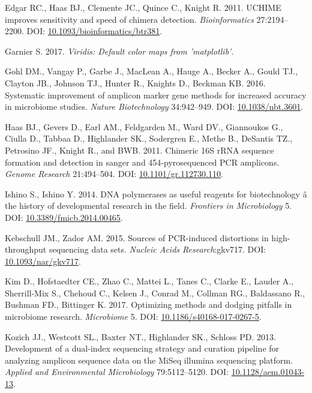 \documentclass[11pt,]{article}
\begin{document}
\hypertarget{ref-uchime_Edgar_2011}{}
Edgar RC., Haas BJ., Clemente JC., Quince C., Knight R. 2011. UCHIME
improves sensitivity and speed of chimera detection.
\emph{Bioinformatics} 27:2194--2200. DOI:
\href{https://doi.org/10.1093/bioinformatics/btr381}{10.1093/bioinformatics/btr381}.

\hypertarget{ref-viridis_citation_2017}{}
Garnier S. 2017. \emph{Viridis: Default color maps from 'matplotlib'}.

\hypertarget{ref-taq_Gohl_2016}{}
Gohl DM., Vangay P., Garbe J., MacLean A., Hauge A., Becker A., Gould
TJ., Clayton JB., Johnson TJ., Hunter R., Knights D., Beckman KB. 2016.
Systematic improvement of amplicon marker gene methods for increased
accuracy in microbiome studies. \emph{Nature Biotechnology} 34:942--949.
DOI: \href{https://doi.org/10.1038/nbt.3601}{10.1038/nbt.3601}.

\hypertarget{ref-Haas2011}{}
Haas BJ., Gevers D., Earl AM., Feldgarden M., Ward DV., Giannoukos G.,
Ciulla D., Tabbaa D., Highlander SK., Sodergren E., Methe B., DeSantis
TZ., Petrosino JF., Knight R., and BWB. 2011. Chimeric 16S rRNA sequence
formation and detection in sanger and 454-pyrosequenced PCR amplicons.
\emph{Genome Research} 21:494--504. DOI:
\href{https://doi.org/10.1101/gr.112730.110}{10.1101/gr.112730.110}.

\hypertarget{ref-polymerase_Ishino_2014}{}
Ishino S., Ishino Y. 2014. DNA polymerases as useful reagents for
biotechnology â the history of developmental research in the field.
\emph{Frontiers in Microbiology} 5. DOI:
\href{https://doi.org/10.3389/fmicb.2014.00465}{10.3389/fmicb.2014.00465}.

\hypertarget{ref-Kebschull2015}{}
Kebschull JM., Zador AM. 2015. Sources of PCR-induced distortions in
high-throughput sequencing data sets. \emph{Nucleic Acids
Research}:gkv717. DOI:
\href{https://doi.org/10.1093/nar/gkv717}{10.1093/nar/gkv717}.

\hypertarget{ref-review_Kim_2017}{}
Kim D., Hofstaedter CE., Zhao C., Mattei L., Tanes C., Clarke E., Lauder
A., Sherrill-Mix S., Chehoud C., Kelsen J., Conrad M., Collman RG.,
Baldassano R., Bushman FD., Bittinger K. 2017. Optimizing methods and
dodging pitfalls in microbiome research. \emph{Microbiome} 5. DOI:
\href{https://doi.org/10.1186/s40168-017-0267-5}{10.1186/s40168-017-0267-5}.

\hypertarget{ref-protocol_Kozich_2013}{}
Kozich JJ., Westcott SL., Baxter NT., Highlander SK., Schloss PD. 2013.
Development of a dual-index sequencing strategy and curation pipeline
for analyzing amplicon sequence data on the MiSeq illumina sequencing
platform. \emph{Applied and Environmental Microbiology} 79:5112--5120.
DOI: \href{https://doi.org/10.1128/aem.01043-13}{10.1128/aem.01043-13}.
\end{document}
